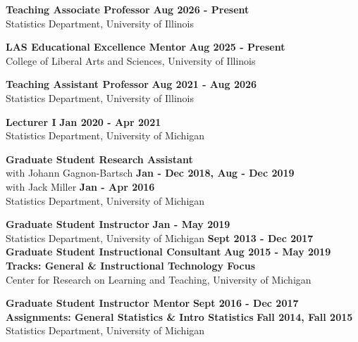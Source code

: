 \documentclass[10pt]{article}
\newcommand{\blankline}{\quad\pagebreak[2]}
\begin{document}
\textbf{Teaching Associate Professor}
\hfill \textbf{Aug 2026 - Present}\\
Statistics Department, University of Illinois

\blankline

\textbf{LAS Educational Excellence Mentor}
\hfill \textbf{Aug 2025 - Present}\\
College of Liberal Arts and Sciences, University of Illinois

\blankline

\textbf{Teaching Assistant Professor}
\hfill \textbf{Aug 2021 - Aug 2026}\\
Statistics Department, University of Illinois

\blankline

\textbf{Lecturer I}
\hfill \textbf{Jan 2020 - Apr 2021}\\
Statistics Department, University of Michigan

\blankline

\textbf{Graduate Student Research Assistant}\\
with Johann Gagnon-Bartsch \hfill \textbf{Jan - Dec 2018, Aug - Dec 2019}\\
with Jack Miller \hfill \textbf{Jan - Apr 2016} \\
Statistics Department, University of Michigan

\blankline

\textbf{Graduate Student Instructor}
\hfill \textbf{Jan - May 2019}\\
Statistics Department, University of Michigan
\hfill \textbf{Sept 2013 - Dec 2017}\\


\textbf{Graduate Student Instructional Consultant}
\hfill \textbf{Aug 2015 - May 2019}\\
\textbf{Tracks: General \& Instructional Technology Focus}\\
Center for Research on Learning and Teaching, University of Michigan

\blankline

\textbf{Graduate Student Instructor Mentor}
\hfill \textbf{Sept 2016 - Dec 2017}\\
\textbf{Assignments: General Statistics \& Intro Statistics}
\hfill \textbf{Fall 2014, Fall 2015}\\
Statistics Department, University of Michigan

\newpage

	
\end{document}
